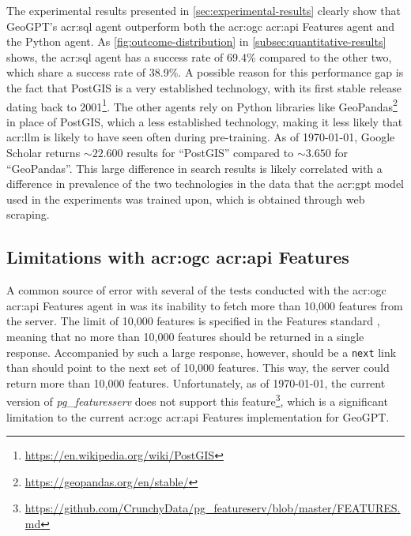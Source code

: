 The experimental results presented in \autoref{sec:experimental-results} clearly show that GeoGPT's \acrshort{acr:sql} agent outperform both the \acrshort{acr:ogc} \acrshort{acr:api} Features agent and the Python agent. As \autoref{fig:outcome-distribution} in \autoref{subsec:quantitative-results} shows, the \acrshort{acr:sql} agent has a success rate of 69.4\% compared to the other two, which share a success rate of 38.9\%. A possible reason for this performance gap is the fact that PostGIS is a very established technology, with its first stable release dating back to 2001\footnote{\url{https://en.wikipedia.org/wiki/PostGIS}}. The other agents rely on Python libraries like GeoPandas\footnote{\url{https://geopandas.org/en/stable/}} in place of PostGIS, which a less established technology, making it less likely that \acrshort{acr:llm} is likely to have seen often during pre-training. As of \today, Google Scholar returns $\sim 22.600$ results for \enquote{PostGIS} compared to  $\sim 3.650$ for \enquote{GeoPandas}. This large difference in search results is likely correlated with a difference in prevalence of the two technologies in the data that the \acrshort{acr:gpt} model used in the experiments was trained upon, which is obtained through web scraping\citep[3]{radfordLanguageModelsAre}.

\subsection[Limitations with OGC API Features]{Limitations with \acrshort{acr:ogc} \acrshort{acr:api} Features}
\label{subsec:difficulties-with-oaf}

A common source of error with several of the tests conducted with the \acrshort{acr:ogc} \acrshort{acr:api} Features agent in was its inability to fetch more than 10,000 features from the server. The limit of 10,000 features is specified in the Features standard \citep{opengeospatialconsortiumOGCAPIFeatures2022}, meaning that no more than 10,000 features should be returned in a single response. Accompanied by such a large response, however, should be a \texttt{next} link than should point to the next set of 10,000 features. This way, the server could return more than 10,000 features. Unfortunately, as of \today, the current version of \textit{pg\_featuresserv} does not support this feature\footnote{\url{https://github.com/CrunchyData/pg_featureserv/blob/master/FEATURES.md}}, which is a significant limitation to the current \acrshort{acr:ogc} \acrshort{acr:api} Features implementation for GeoGPT.

